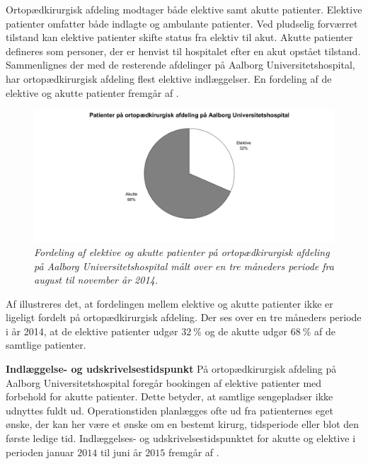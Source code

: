 Ortopædkirurgisk afdeling modtager både elektive samt akutte patienter. Elektive patienter omfatter både indlagte og ambulante patienter. Ved pludselig forværret tilstand kan elektive patienter skifte status fra elektiv til akut. Akutte patienter defineres som personer, der er henvist til hospitalet efter en akut opstået tilstand. Sammenlignes der med de resterende afdelinger på Aalborg Universitetshospital, har ortopædkirurgisk afdeling flest elektive indlæggelser.\cite{RegionNord2016} En fordeling af de elektive og akutte patienter fremgår af .

\begin{figure}[H]
	\flushleft 
	\centering
	\includegraphics[scale=0.8]{figures/elektivvsakut.png}
	\flushleft
	\caption{\textit{Fordeling af elektive og akutte patienter på ortopædkirurgisk afdeling på Aalborg Universitetshospital målt over en tre måneders periode fra august til november år 2014.}}
	\label{elektivvsakut}
	\end{figure}

\noindent
Af  illustreres det, at fordelingen mellem elektive og akutte patienter ikke er ligeligt fordelt på ortopædkirurgisk afdeling. Der ses over en tre måneders periode i år 2014, at de elektive patienter udgør $32~\%$ og de akutte udgør $68~\%$ af de samtlige patienter. 

\textbf{Indlæggelse- og udskrivelsestidspunkt}
På ortopædkirurgisk afdeling på Aalborg Universitetshospital foregår bookingen af elektive patienter med forbehold for akutte patienter. Dette betyder, at samtlige sengepladser ikke udnyttes fuldt ud. Operationstiden planlægges ofte ud fra patienternes eget ønske, der kan her være et ønske om en bestemt kirurg, tidsperiode eller blot den første ledige tid. Indlæggelses- og udskrivelsestidspunktet for akutte og elektive i perioden januar $2014$ til juni år $2015$ fremgår af . 


